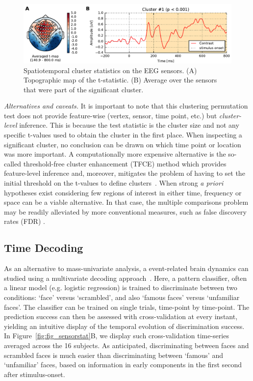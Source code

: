 \begin{figure}
\centering
\includegraphics[width=\linewidth]{figures/spatiotemporal_stats_cluster_highpass-NoneHz-00.pdf}
\caption[Spatiotemporal cluster statistics on EEG sensors.]{Spatiotemporal cluster statistics on the EEG sensors. (A) Topographic map of the t-statistic. (B) Average over the sensors that were part of the significant cluster.}
\label{fig:stclusterstats}
\end{figure}
\emph{Alternatives and caveats.} It is important to note that this clustering permutation test does not provide feature-wise (vertex, sensor, time point, etc.) but \emph{cluster-level} inference. This is because the test statistic is the cluster size and not any specific t-values used to obtain the cluster in the first place. When inspecting a significant cluster, no conclusion can be drawn on which time point or location was more important. A computationally more expensive alternative is the so-called threshold-free cluster enhancement (TFCE) method which provides feature-level inference and, moreover, mitigates the problem of having to set the initial threshold on the t-values to define clusters~\citep{TFCE}. When strong \emph{a priori} hypotheses exist considering few regions of interest in either time, frequency or space can be a viable alternative. In that case, the multiple comparisons problem may be readily alleviated by more conventional measures, such as false discovery rates (FDR) \citep{FDR}.

\subsection{Time Decoding}

As an alternative to mass-univariate analysis, a event-related brain dynamics can studied using a multivariate decoding approach~\citep{ramkumar2013feature,king2014characterizing}. Here, a pattern classifier, often a linear model (e.g. logistic regression) is trained to discriminate between two conditions: `face' versus `scrambled', and also `famous faces' versus `unfamiliar faces'. The classifier can be trained on single trials, time-point by time-point. The prediction success can then be assessed with cross-validation at every instant, yielding an intuitive display of the temporal evolution of discrimination success. In Figure~\ref{fig:fig_sensorstat}B, we display such cross-validation time-series averaged across the 16 subjects. As anticipated, discriminating between faces and scrambled faces is much easier than discriminating between `famous' and `unfamiliar' faces, based on information in early components in the first second after stimulus-onset.

